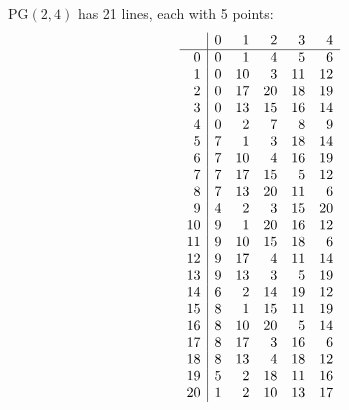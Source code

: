 {PG$(2, 4)$ has 21 lines, each with 5 points:\\
$$
\begin{array}{r|*{5}r}
 & 0 & 1 & 2 & 3 & 4\\
\hline
0 & 0 & 1 & 4 & 5 & 6\\
1 & 0 & 10 & 3 & 11 & 12\\
2 & 0 & 17 & 20 & 18 & 19\\
3 & 0 & 13 & 15 & 16 & 14\\
4 & 0 & 2 & 7 & 8 & 9\\
5 & 7 & 1 & 3 & 18 & 14\\
6 & 7 & 10 & 4 & 16 & 19\\
7 & 7 & 17 & 15 & 5 & 12\\
8 & 7 & 13 & 20 & 11 & 6\\
9 & 4 & 2 & 3 & 15 & 20\\
10 & 9 & 1 & 20 & 16 & 12\\
11 & 9 & 10 & 15 & 18 & 6\\
12 & 9 & 17 & 4 & 11 & 14\\
13 & 9 & 13 & 3 & 5 & 19\\
14 & 6 & 2 & 14 & 19 & 12\\
15 & 8 & 1 & 15 & 11 & 19\\
16 & 8 & 10 & 20 & 5 & 14\\
17 & 8 & 17 & 3 & 16 & 6\\
18 & 8 & 13 & 4 & 18 & 12\\
19 & 5 & 2 & 18 & 11 & 16\\
20 & 1 & 2 & 10 & 13 & 17\\
\end{array}
$$

}
